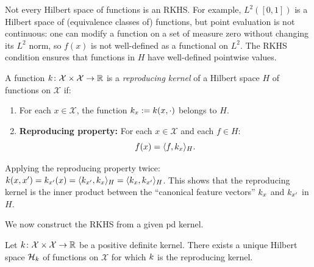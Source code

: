 \documentclass[11pt,a4paper]{article}
\begin{document}
\begin{remark}
\label{rem:not-all-hilbert-rkhs}
Not every Hilbert space of functions is an RKHS. For example,
$L^2([0,1])$ is a Hilbert space of (equivalence classes of)
functions, but point evaluation is not continuous: one can modify
a function on a set of measure zero without changing its $L^2$
norm, so $f(x)$ is not well-defined as a functional on $L^2$.
The RKHS condition ensures that functions in $H$ have
well-defined pointwise values.
\end{remark}

\begin{definition}
\label{def:reproducing-kernel}
A function $k \colon \mathcal{X} \times \mathcal{X} \to \mathbb{R}$ is
a \emph{reproducing kernel} of a Hilbert space $H$ of functions on
$\mathcal{X}$ if:
\begin{enumerate}[label=(RK\arabic*)]
    \item For each $x \in \mathcal{X}$, the function $k_x :=
    k(x, \cdot)$ belongs to $H$.
    \item \textbf{Reproducing property:} For each $x \in \mathcal{X}$
    and each $f \in H$:
    \begin{equation}
    \label{eq:reproducing-property}
    f(x) = \langle f, k_x \rangle_H.
    \end{equation}
\end{enumerate}
\end{definition}

\begin{remark}
\label{rem:kernel-ip}
Applying the reproducing property twice: $k(x, x') =
k_{x'}(x) = \langle k_{x'}, k_x \rangle_H =
\langle k_x, k_{x'} \rangle_H$. This shows that the
reproducing kernel is the inner product between the ``canonical
feature vectors'' $k_x$ and $k_{x'}$ in $H$.
\end{remark}

We now construct the RKHS from a given pd kernel.

\begin{theorem}
\label{thm:rkhs-construction}
Let $k \colon \mathcal{X} \times \mathcal{X} \to \mathbb{R}$ be a
positive definite kernel. There exists a unique Hilbert space
$\mathcal{H}_k$ of functions on $\mathcal{X}$ for which $k$ is
the reproducing kernel.
\end{theorem}
\end{document}
